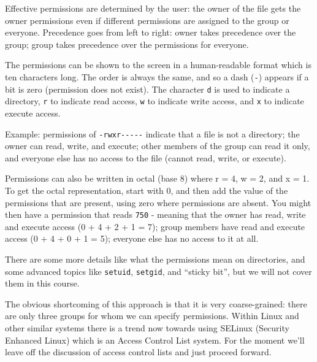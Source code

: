 Effective permissions are determined by the user: the owner of the file gets the owner permissions even if different permissions are assigned to the group or everyone. Precedence goes from left to right: owner takes precedence over the group; group takes precedence over the permissions for everyone.

The permissions can be shown to the screen in a human-readable format which is ten characters long. The order is always the same, and so a dash (\texttt{-}) appears if a bit is zero (permission does not exist). The character \texttt{d} is used to indicate a directory, \texttt{r} to indicate read access, \texttt{w} to indicate write access, and \texttt{x} to indicate execute access.

Example: permissions of \texttt{-rwxr{-}{-}{-}{-}{-}} indicate that a file is not a directory; the owner can read, write, and execute; other members of the group can read it only, and everyone else has no access to the file (cannot read, write, or execute).

Permissions can also be written in octal (base 8) where r = 4, w = 2, and x = 1. To get the octal representation, start with 0, and then add the value of the  permissions that are present, using zero where permissions are absent. You might then have a permission that reads \texttt{750} - meaning that the owner has read, write and execute access (0 + 4 + 2 + 1 = 7); group members have read and execute access (0 + 4 + 0 + 1 = 5); everyone else has no access to it at all.

There are some more details like what the permissions mean on directories, and some advanced topics like \texttt{setuid}, \texttt{setgid}, and ``sticky bit'', but we will not cover them in this course.

The obvious shortcoming of this approach is that it is very coarse-grained: there are only three groups for whom we can specify permissions. Within Linux and other similar systems there is a trend now towards using SELinux (Security Enhanced Linux) which is an Access Control List system. For the moment we'll leave off the discussion of access control lists and just proceed forward.



